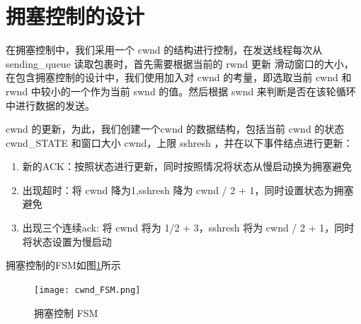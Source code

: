\section{拥塞控制的设计}

在拥塞控制中，我们采用一个 cwnd 的结构进行控制，在发送线程每次从 sending\_queue 读取包裹时，首先需要根据当前的 rwnd 更新 滑动窗口的大小，在包含拥塞控制的设计中，我们使用加入对 cwnd 的考量，即选取当前 cwnd 和 rwnd 中较小的一个作为当前 swnd 的值。然后根据 swnd 来判断是否在该轮循环中进行数据的发送。

cwnd 的更新，为此，我们创建一个cwnd 的数据结构，包括当前 cwnd 的状态 cwnd\_STATE 和窗口大小 cwnd，上限 sshresh ，并在以下事件结点进行更新：

\begin{enumerate}
    \item 新的ACK：按照状态进行更新，同时按照情况将状态从慢启动换为拥塞避免
    \item 出现超时：将 cwnd 降为1,sshresh 降为 cwnd / 2 + 1，同时设置状态为拥塞避免
    \item 出现三个连续ack: 将 cwnd 将为 1/2 + 3，sshresh 将为 cwnd / 2 + 1，同时将状态设置为慢启动
\end{enumerate}

拥塞控制的FSM如图\ref{fig:cwnd_FSM}所示


\begin{figure}[!htbp]
    \centering
    \texttt{[image: cwnd\_FSM.png]}
    \label{fig:cwnd_FSM}\caption{拥塞控制 FSM}
  \end{figure}



